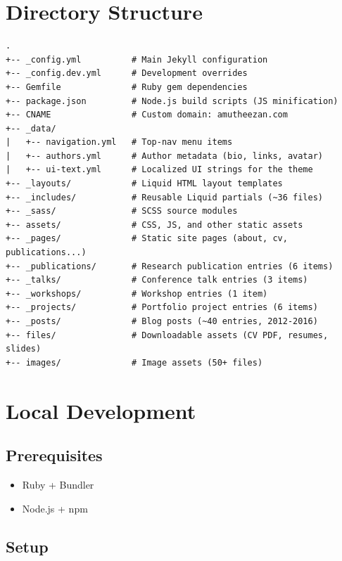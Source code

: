 \documentclass[11pt, a4paper]{article}
\begin{document}
\section{Directory Structure}

\begin{lstlisting}
.
+-- _config.yml          # Main Jekyll configuration
+-- _config.dev.yml      # Development overrides
+-- Gemfile              # Ruby gem dependencies
+-- package.json         # Node.js build scripts (JS minification)
+-- CNAME                # Custom domain: amutheezan.com
+-- _data/
|   +-- navigation.yml   # Top-nav menu items
|   +-- authors.yml      # Author metadata (bio, links, avatar)
|   +-- ui-text.yml      # Localized UI strings for the theme
+-- _layouts/            # Liquid HTML layout templates
+-- _includes/           # Reusable Liquid partials (~36 files)
+-- _sass/               # SCSS source modules
+-- assets/              # CSS, JS, and other static assets
+-- _pages/              # Static site pages (about, cv, publications...)
+-- _publications/       # Research publication entries (6 items)
+-- _talks/              # Conference talk entries (3 items)
+-- _workshops/          # Workshop entries (1 item)
+-- _projects/           # Portfolio project entries (6 items)
+-- _posts/              # Blog posts (~40 entries, 2012-2016)
+-- files/               # Downloadable assets (CV PDF, resumes, slides)
+-- images/              # Image assets (50+ files)
\end{lstlisting}

\section{Local Development}

\subsection*{Prerequisites}

\begin{itemize}[leftmargin=1.5em, itemsep=2pt]
    \item Ruby + Bundler
    \item Node.js + npm
\end{itemize}

\subsection*{Setup}
\end{document}
